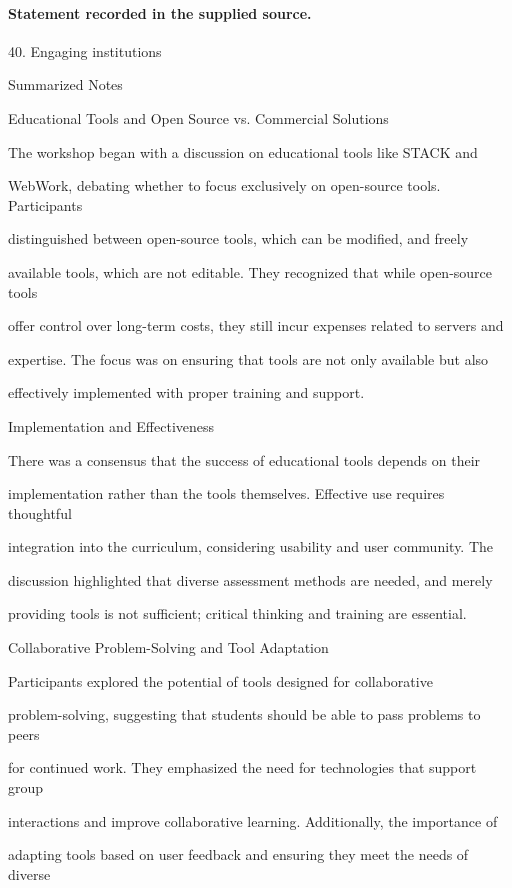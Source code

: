 \documentclass[11pt]{article}
\begin{document}
\paragraph{Statement recorded in the supplied source.}
40. Engaging institutions

Summarized Notes

Educational Tools and Open Source vs. Commercial Solutions

The workshop began with a discussion on educational tools like STACK and

WebWork, debating whether to focus exclusively on open-source tools. Participants

distinguished between open-source tools, which can be modified, and freely

available tools, which are not editable. They recognized that while open-source tools

offer control over long-term costs, they still incur expenses related to servers and

expertise. The focus was on ensuring that tools are not only available but also

effectively implemented with proper training and support.

Implementation and Effectiveness

There was a consensus that the success of educational tools depends on their

implementation rather than the tools themselves. Effective use requires thoughtful

integration into the curriculum, considering usability and user community. The

discussion highlighted that diverse assessment methods are needed, and merely

providing tools is not sufficient; critical thinking and training are essential.

Collaborative Problem-Solving and Tool Adaptation

Participants explored the potential of tools designed for collaborative

problem-solving, suggesting that students should be able to pass problems to peers

for continued work. They emphasized the need for technologies that support group

interactions and improve collaborative learning. Additionally, the importance of

adapting tools based on user feedback and ensuring they meet the needs of diverse
\end{document}
